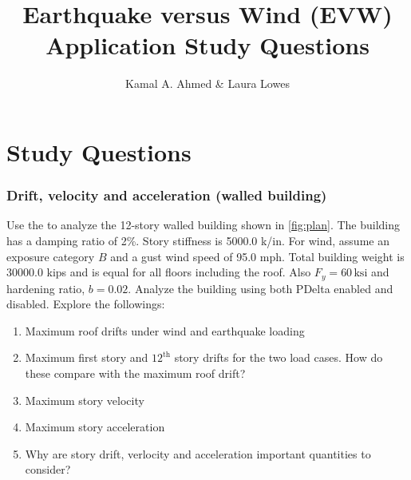 \documentclass{simcenterdocumentation}
\newcommand{\ksi}{\ensuremath{\,\mathrm{ksi}}}
\begin{document}
\title{Earthquake versus Wind (EVW) Application Study Questions}

\author{Kamal A. Ahmed \& Laura Lowes}

\hypersetup{pageanchor=false}
\maketitle
\copyrightpage
\acknowledgments


%

\graphicspath{{figures/}{}}

\renewcommand{\thesection}{Problem \arabic{section}}
\renewcommand{\thesubsubsection}{Problem \arabic{subsubsection}}
\section*{Study Questions}

\subsubsection{\label{sec:p1}Drift, velocity and acceleration (walled building)} Use the  to analyze the 12-story walled building shown in \cref{fig:plan}. The building has a damping ratio of 2\%. Story stiffness is 5000.0 k/in. For wind, assume an exposure category $B$ and a gust wind speed of 95.0 mph. Total building weight is 30000.0 kips and is equal for all floors including the roof. Also $F_y = 60 \ksi$ and hardening ratio, $b = 0.02$. Analyze the building using both PDelta enabled and disabled. Explore the followings:
\begin{enumerate}[label=\alph*)]
	\item Maximum roof drifts under wind and earthquake loading
	\item Maximum first story and $12^\mathrm{th}$ story drifts
          for the two load cases. How do these compare with the
          maximum roof drift?
	\item Maximum story velocity
	\item Maximum story acceleration
	\item Why are story drift, verlocity and acceleration
          important quantities to consider?
\end{enumerate}
\end{document}
